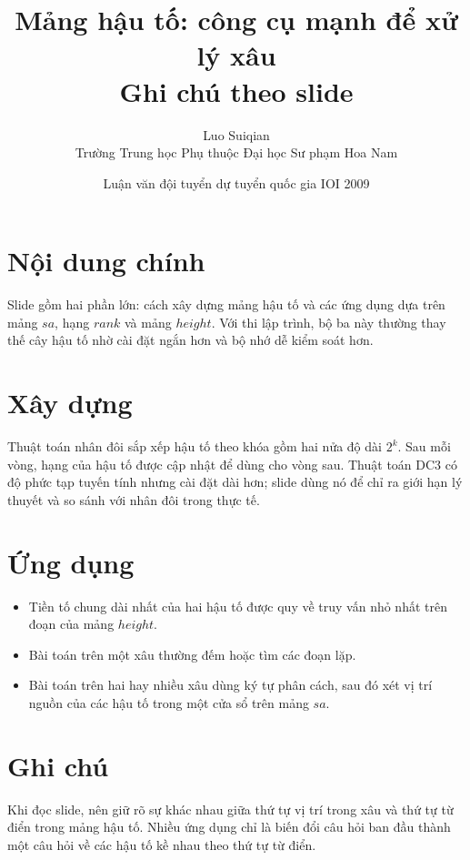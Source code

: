 \documentclass[11pt]{article}
\title{Mảng hậu tố: công cụ mạnh để xử lý xâu\\{\large Ghi chú theo slide}}
\author{Luo Suiqian\\Trường Trung học Phụ thuộc Đại học Sư phạm Hoa Nam}
\date{Luận văn đội tuyển dự tuyển quốc gia IOI 2009}
\begin{document}
\maketitle


\section{Nội dung chính}

Slide gồm hai phần lớn: cách xây dựng mảng hậu tố và các ứng dụng dựa trên
mảng \(sa\), hạng \(rank\) và mảng \(height\). Với thi lập trình, bộ ba này
thường thay thế cây hậu tố nhờ cài đặt ngắn hơn và bộ nhớ dễ kiểm soát hơn.

\section{Xây dựng}

Thuật toán nhân đôi sắp xếp hậu tố theo khóa gồm hai nửa độ dài \(2^k\). Sau
mỗi vòng, hạng của hậu tố được cập nhật để dùng cho vòng sau. Thuật toán DC3
có độ phức tạp tuyến tính nhưng cài đặt dài hơn; slide dùng nó để chỉ ra giới
hạn lý thuyết và so sánh với nhân đôi trong thực tế.

\section{Ứng dụng}

\begin{itemize}
  \item Tiền tố chung dài nhất của hai hậu tố được quy về truy vấn nhỏ nhất
  trên đoạn của mảng \(height\).
  \item Bài toán trên một xâu thường đếm hoặc tìm các đoạn lặp.
  \item Bài toán trên hai hay nhiều xâu dùng ký tự phân cách, sau đó xét vị
  trí nguồn của các hậu tố trong một cửa sổ trên mảng \(sa\).
\end{itemize}

\section{Ghi chú}

Khi đọc slide, nên giữ rõ sự khác nhau giữa thứ tự vị trí trong xâu và thứ tự
từ điển trong mảng hậu tố. Nhiều ứng dụng chỉ là biến đổi câu hỏi ban đầu
thành một câu hỏi về các hậu tố kề nhau theo thứ tự từ điển.
\end{document}
